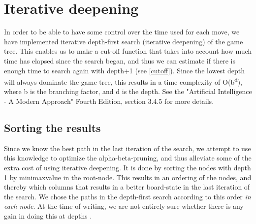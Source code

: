 \section{Iterative deepening}
In order to be able to have some control over the time used for each move, we have implemented iterative depth-first search (iterative deepening) of the game tree. This enables us to make a cut-off function that takes into account how much time has elapsed since the search began, and thus we can estimate if there is enough time to search again with depth+1 (see \ref{cutoff}). 
Since the lowest depth will always dominate the game tree, this results in a time complexity of O(b\textsuperscript{d}), where b is the branching factor, and d is the depth. See the "Artificial Intelligence - A Modern Approach" Fourth Edition, section 3.4.5 for more details.

\subsection{Sorting the results}
Since we know the best path in the last iteration of the search, we attempt to use this knowledge to optimize the alpha-beta-pruning, and thus alleviate some of the extra cost of using iterative deepening. It is done by sorting the nodes with depth 1 by minimaxvalue in the root-node. This results in an ordering of the nodes, and thereby which columns that results in a better board-state in the last iteration of the search. We chose the paths in the depth-first search according to this order \emph{in each node}. At the time of writing, we are not entirely sure whether there is any gain in doing this at depths .